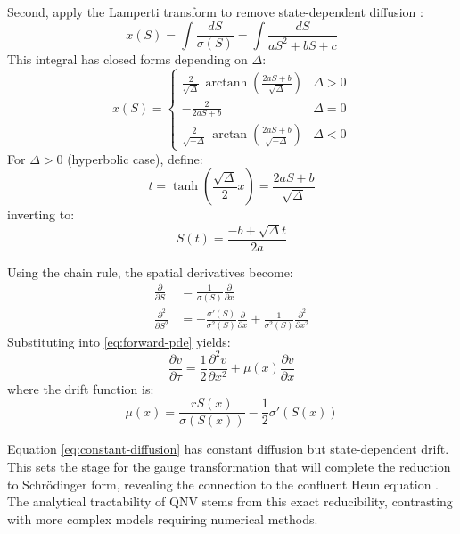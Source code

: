 \documentclass[a4paper,11pt]{article}
\begin{document}
Second, apply the Lamperti transform to remove state-dependent diffusion \cite{Lamperti1962, MollerMadsen2010}:
\begin{equation}
x(S) = \int \frac{dS}{\sigma(S)} = \int \frac{dS}{aS^2 + bS + c}
\label{eq:lamperti}
\end{equation}
This integral has closed forms depending on $\Delta$:
\begin{equation}
x(S) = 
\begin{cases}
\frac{2}{\sqrt{\Delta}} \, \operatorname{arctanh}\!\left(\frac{2aS + b}{\sqrt{\Delta}}\right) & \Delta > 0 \\
-\frac{2}{2aS + b} & \Delta = 0 \\
\frac{2}{\sqrt{-\Delta}} \, \arctan\!\left(\frac{2aS + b}{\sqrt{-\Delta}}\right) & \Delta < 0
\end{cases}
\end{equation}
For $\Delta > 0$ (hyperbolic case), define:
\begin{equation}
t = \tanh\left(\frac{\sqrt{\Delta}}{2}x\right) = \frac{2aS + b}{\sqrt{\Delta}}
\label{eq:t-def}
\end{equation}
inverting to:
\begin{equation}
S(t) = \frac{-b + \sqrt{\Delta}t}{2a}
\end{equation}

Using the chain rule, the spatial derivatives become:
\begin{align}
\frac{\partial}{\partial S} &= \frac{1}{\sigma(S)}\frac{\partial}{\partial x} \\
\frac{\partial^2}{\partial S^2} &= -\frac{\sigma'(S)}{\sigma^2(S)}\frac{\partial}{\partial x} + \frac{1}{\sigma^2(S)}\frac{\partial^2}{\partial x^2}
\end{align}
Substituting into \eqref{eq:forward-pde} yields:
\begin{equation}
\frac{\partial v}{\partial \tau} = \frac{1}{2}\frac{\partial^2 v}{\partial x^2} + \mu(x)\frac{\partial v}{\partial x}
\label{eq:constant-diffusion}
\end{equation}
where the drift function is:
\begin{equation}
\mu(x) = \frac{rS(x)}{\sigma(S(x))} - \frac{1}{2}\sigma'(S(x))
\end{equation}

Equation \eqref{eq:constant-diffusion} has constant diffusion but state-dependent drift. This sets the stage for the gauge transformation that will complete the reduction to Schrödinger form, revealing the connection to the confluent Heun equation \cite{CarrFisherRuf2013, Zuhlsdorff2001}. The analytical tractability of QNV stems from this exact reducibility, contrasting with more complex models requiring numerical methods.
\end{document}
